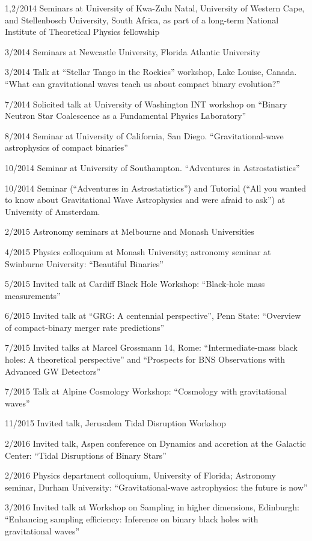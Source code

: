 \documentclass[margin,line]{res}
\begin{document}
\begin{resume}
1,2/2014	Seminars at University of Kwa-Zulu Natal, University of Western Cape, and Stellenbosch University, South Africa, as part of a long-term National Institute of Theoretical Physics fellowship

3/2014	Seminars at Newcastle University, Florida Atlantic University

3/2014	Talk at ``Stellar Tango in the Rockies'' workshop, Lake Louise, Canada.  ``What can gravitational waves teach us about compact binary evolution?''

7/2014	Solicited talk at University of Washington INT workshop on ``Binary Neutron Star Coalescence as a Fundamental Physics Laboratory''

8/2014 	Seminar at University of California, San Diego.   ``Gravitational-wave astrophysics of compact binaries''

10/2014	Seminar at University of Southampton.  ``Adventures in Astrostatistics''

10/2014	Seminar (``Adventures in Astrostatistics'') and Tutorial (``All you wanted to know about Gravitational Wave Astrophysics and were afraid to ask'') at University of Amsterdam.  

2/2015	Astronomy seminars at Melbourne and Monash Universities

4/2015 	Physics colloquium at Monash University; astronomy seminar at Swinburne University:  ``Beautiful Binaries''

5/2015	Invited talk at Cardiff Black Hole Workshop: ``Black-hole mass measurements''

6/2015	Invited talk at ``GRG: A centennial perspective'', Penn State: ``Overview of compact-binary merger rate predictions''

7/2015	Invited talks at Marcel Grossmann 14, Rome: ``Intermediate-mass black holes: A theoretical perspective'' and ``Prospects for BNS Observations with Advanced GW Detectors''

7/2015	Talk at Alpine Cosmology Workshop: ``Cosmology with gravitational waves''

11/2015	Invited talk, Jerusalem Tidal Disruption Workshop

2/2016 	Invited talk, Aspen conference on Dynamics and accretion at the Galactic Center: ``Tidal Disruptions of Binary Stars''

2/2016	Physics department colloquium, University of Florida;  Astronomy seminar, Durham University: ``Gravitational-wave astrophysics: the future is now''

3/2016	Invited talk at Workshop on Sampling in higher dimensions, Edinburgh: ``Enhancing sampling efficiency: Inference on binary black holes with gravitational waves''


\end{resume}
\end{document}
